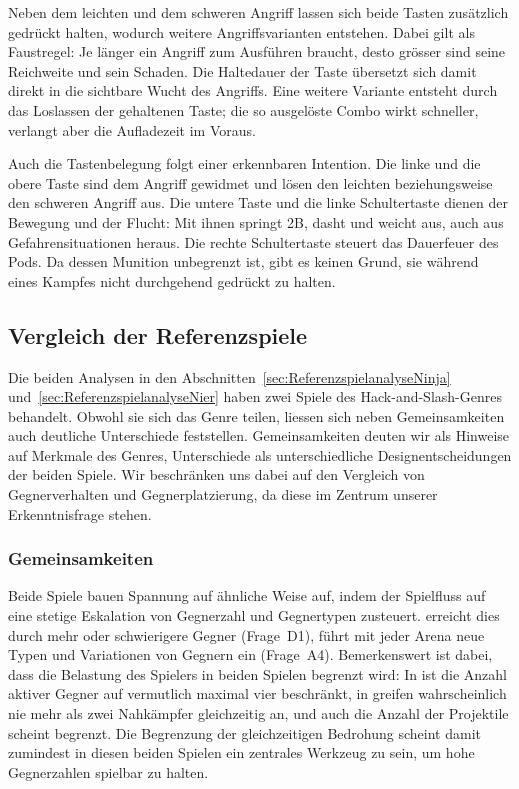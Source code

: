 \documentclass[../Main.tex]{subfiles}
\begin{document}
Neben dem leichten und dem schweren Angriff lassen sich beide Tasten zusätzlich gedrückt halten, wodurch weitere Angriffsvarianten entstehen. Dabei gilt als Faustregel: Je länger ein Angriff zum Ausführen braucht, desto grösser sind seine Reichweite und sein Schaden. Die Haltedauer der Taste übersetzt sich damit direkt in die sichtbare Wucht des Angriffs. Eine weitere Variante entsteht durch das Loslassen der gehaltenen Taste; die so ausgelöste Combo wirkt schneller, verlangt aber die Aufladezeit im Voraus.

Auch die Tastenbelegung folgt einer erkennbaren Intention. Die linke und die obere Taste sind dem Angriff gewidmet und lösen den leichten beziehungsweise den schweren Angriff aus. Die untere Taste und die linke Schultertaste dienen der Bewegung und der Flucht: Mit ihnen springt 2B, dasht und weicht aus, auch aus Gefahrensituationen heraus. Die rechte Schultertaste steuert das Dauerfeuer des Pods. Da dessen Munition unbegrenzt ist, gibt es keinen Grund, sie während eines Kampfes nicht durchgehend gedrückt zu halten.

\subsection{Vergleich der Referenzspiele} \label{sec:Vergleich}

Die beiden Analysen in den Abschnitten~\ref{sec:ReferenzspielanalyseNinja} und~\ref{sec:ReferenzspielanalyseNier} haben zwei Spiele des Hack-and-Slash-Genres behandelt. Obwohl sie sich das Genre teilen, liessen sich neben Gemeinsamkeiten auch deutliche Unterschiede feststellen. Gemeinsamkeiten deuten wir als Hinweise auf Merkmale des Genres, Unterschiede als unterschiedliche Designentscheidungen der beiden Spiele. Wir beschränken uns dabei auf den Vergleich von Gegnerverhalten und Gegnerplatzierung, da diese im Zentrum unserer Erkenntnisfrage stehen.

\subsubsection{Gemeinsamkeiten}

Beide Spiele bauen Spannung auf ähnliche Weise auf, indem der Spielfluss auf eine stetige Eskalation von Gegnerzahl und Gegnertypen zusteuert.  erreicht dies durch mehr oder schwierigere Gegner (Frage~D1),  führt mit jeder Arena neue Typen und Variationen von Gegnern ein (Frage~A4). Bemerkenswert ist dabei, dass die Belastung des Spielers in beiden Spielen begrenzt wird: In  ist die Anzahl aktiver Gegner auf vermutlich maximal vier beschränkt, in  greifen wahrscheinlich nie mehr als zwei Nahkämpfer gleichzeitig an, und auch die Anzahl der Projektile scheint begrenzt. Die Begrenzung der gleichzeitigen Bedrohung scheint damit zumindest in diesen beiden Spielen ein zentrales Werkzeug zu sein, um hohe Gegnerzahlen spielbar zu halten.
\end{document}
